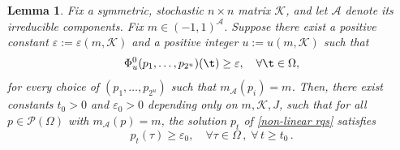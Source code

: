 \documentclass[11pt,reqno]{amsart}
\numberwithin{equation}{section}
\numberwithin{figure}{section}
\newtheorem{lemma}[theorem]{Lemma}
\renewcommand{\geq}{\ge} %
\newcommand{\1}{\mathds{1}}
\let\O=\Omega
\newcommand{\cA}{\ensuremath{\mathcal A}}
\newcommand{\cK}{\ensuremath{\mathcal K}}
\newcommand{\cP}{\ensuremath{\mathcal P}}
\begin{document}
\begin{lemma}\label{Lemma reduction conv}
Fix a symmetric, stochastic $n\times n$ matrix $\cK$, and let $\cA$ denote its irreducible components. Fix \(m \in (-1,1)^{\mathcal{A}}\). 
Suppose there exist a positive constant \(\varepsilon := \varepsilon(m,\mathcal{K})\) and a positive integer \(u := u(m,\mathcal{K})\) such that
\begin{equation}\label{assumpJ=0}
    \Phi^0_u(p_1,\dots,p_{2^u})(\t) \geq \varepsilon, \quad \forall \t\in\O,
\end{equation}
for every choice of  \( (p_1, \ldots, p_{2^u})\) such that $m_\cA(p_i)=m$. 
Then,  there exist constants \(t_0>0\) and \(\varepsilon_0>0\) depending only on $m,\cK,J$,  such that for all $p\in\cP(\O)$ with $m_\cA(p)=m$, the solution \(p_t\) of \eqref{non-linear rqs} satisfies 
\begin{equation}\label{eq:desib}
p_t( \tau)\geq \varepsilon_0, \quad \forall\tau\in\Omega\,, \;\forall\,t\ge t_0\,.
\end{equation}
\end{lemma}
\end{document}
